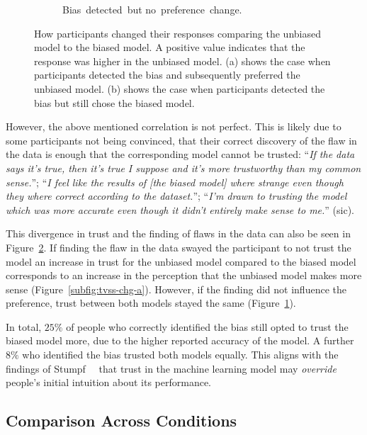 \begin{figure}[t]
\begin{subfigure}{0.49\linewidth}
\caption{\centering Bias~detected~but no~preference~change.}
\label{subfig:tvss-chg-b}
\end{subfigure}%
\caption[Change in trust and whether the model makes sense.]{
How participants changed their responses comparing the unbiased model to the biased model.
A positive value indicates that the response was higher in the unbiased model.
(a) shows the case when participants detected the bias and subsequently preferred the unbiased model.
(b) shows the case when participants detected the bias but still chose the biased model.
}
\label{figs:tvss-chg}
\end{figure}

However, the above mentioned correlation is not perfect.
This is likely due to some participants not being convinced, that their correct discovery of the flaw in the data is enough that the corresponding model cannot be trusted:
``\emph{If the data says it's true, then it's true I suppose and it's more trustworthy than my common sense.}'';
``\emph{I feel like the results of [the biased model] where strange even though they where correct according to the dataset.}'';
``\emph{I'm drawn to trusting the model which was more accurate even though it didn't entirely make sense to me.}'' (sic).

This divergence in trust and the finding of flaws in the data can also be seen in Figure~\ref{figs:tvss-chg}.
If finding the flaw in the data swayed the participant to not trust the model an increase in trust for the unbiased model compared to the biased model corresponds to an increase in the perception that the unbiased model makes more sense (Figure~\ref{subfig:tvss-chg-a}).
However, if the finding did not influence the preference, trust between both models stayed the same (Figure~\ref{subfig:tvss-chg-b}).

In total, $25\%$ of people who correctly identified the bias still opted to trust the biased model more, due to the higher reported accuracy of the model.
A further $8\%$ who identified the bias trusted both models equally.
This aligns with the findings of Stumpf~\etal~\cite{harmful} that trust in the machine learning model may \emph{override} people's initial intuition about its performance.

\subsection{Comparison Across Conditions}

